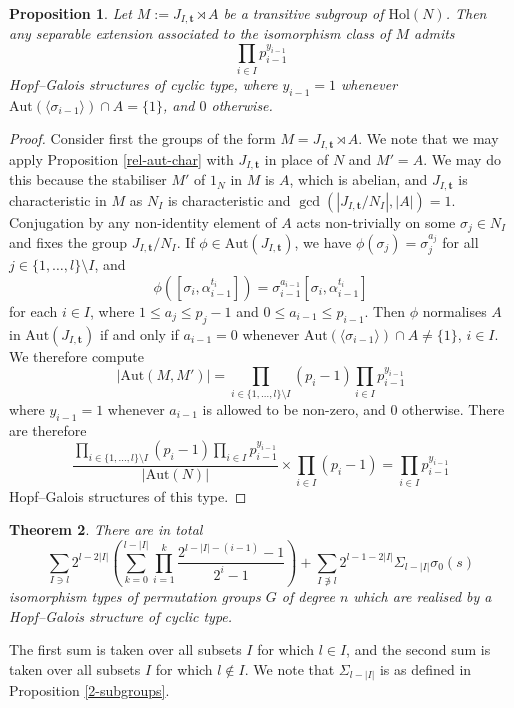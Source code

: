 \documentclass[a4paper,reqno]{amsart}
\newtheorem{theorem}{Theorem}[section]
\newtheorem{proposition}[theorem]{Proposition}
\theoremstyle{definition}
\newcommand{\bt}{\textbf{t}}
\newcommand{\Aut}{\mathrm{Aut}}
\newcommand{\Hol}{\mathrm{Hol}}
\begin{document}
\begin{proposition}\label{cyclic_HGS_Cunningham}
    Let $M:=J_{I,\bt}\rtimes A$ be a transitive subgroup of $\Hol(N)$. Then any separable extension associated to the isomorphism class of $M$ admits
    \[\prod_{i \in I}p_{i-1}^{y_{i-1}}\]
    Hopf--Galois structures of cyclic type, where $y_{i-1}=1$ whenever $\Aut(\langle \sigma_{i-1} \rangle) \cap A = \{1\}$, and $0$ otherwise.
\end{proposition}
\begin{proof}
    Consider first the groups of the form $M=J_{I,\bt}\rtimes A$. We note that we may apply Proposition \ref{rel-aut-char} with $J_{I,\bt}$ in place of $N$ and $M'=A$. We may do this because the stabiliser $M'$ of $1_N$ in $M$ is $A$, which is abelian, and $J_{I,\bt}$ is characteristic in $M$ as $N_I$ is characteristic and $\gcd(|J_{I,\bt}/N_I|,|A|)=1$. Conjugation by any non-identity element of $A$ acts non-trivially on some $\sigma_j\in N_I$ and fixes the group $J_{I,\bt}/N_I$. If $\phi \in \Aut(J_{I,\bt})$, we have $\phi(\sigma_j)=\sigma_j^{a_j}$ for all $j \in \{1,\ldots, l\}\setminus I$, and
    \[\phi\left(\left[\sigma_i,\alpha_{i-1}^{t_i}\right]\right)=\sigma_{i-1}^{a_{i-1}}\left[\sigma_i,\alpha_{i-1}^{t_i}\right]\]
    for each $i \in I$, where $1\leq a_j \leq p_j-1$ and $0\leq a_{i-1} \leq p_{i-1}$. Then $\phi$ normalises $A$ in $\Aut(J_{I,\bt})$ if and only if $a_{i-1}=0$ whenever $\Aut(\langle \sigma_{i-1} \rangle) \cap A \neq \{1\}$, $i \in I$. We therefore compute
    \[|\Aut(M,M')|=\prod_{i \in \{1,\ldots,l\}\setminus I}(p_i-1)\prod_{i \in I}p_{i-1}^{y_{i-1}}\] where $y_{i-1}=1$ whenever $a_{i-1}$ is allowed to be non-zero, and $0$ otherwise. There are therefore
    \[\frac{\prod_{i \in \{1,\ldots,l\}\setminus I}(p_i-1)\prod_{i \in I}p_{i-1}^{y_{i-1}}}{|\Aut(N)|}\times \prod_{i \in I}(p_i-1)=\prod_{i \in I}p_{i-1}^{y_{i-1}}\]
    Hopf--Galois structures of this type.
\end{proof}
\begin{theorem}\label{cyclic_cunningham_thm}
    There are in total
    \[\sum_{I \ni l}2^{l-2|I|}\left(\sum_{k=0}^{l-|I|}\prod_{i=1}^k\frac{2^{l-|I|-(i-1)}-1}{2^i-1}\right)+\sum_{I \not\ni l}2^{l-1-2|I|}\Sigma_{l-|I|}\sigma_0(s)\]
    isomorphism types of permutation groups $G$ of degree $n$ which are realised by a Hopf--Galois structure of cyclic type.
\end{theorem}
    The first sum is taken over all subsets $I$ for which $l \in I$, and the second sum is taken over all subsets $I$ for which $l \notin I$. We note that $\Sigma_{l-|I|}$ is as defined in Proposition \ref{2-subgroups}.
\end{document}
